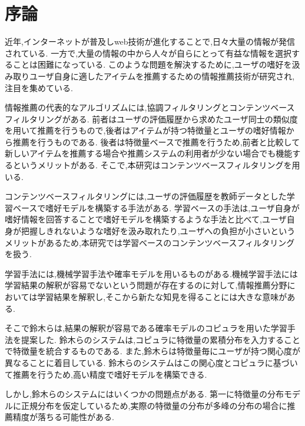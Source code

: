 \chapter{序論}
\hspace{1em}近年,インターネットが普及しweb技術が進化することで,日々大量の情報が発信されている.
一方で,大量の情報の中から人々が自らにとって有益な情報を選択することは困難になっている.
このような問題を解決するために,ユーザの嗜好を汲み取りユーザ自身に適したアイテムを推薦するための情報推薦技術が研究され,注目を集めている.\par
情報推薦の代表的なアルゴリズムには,協調フィルタリング\cite{user-based-collaborative-filtering}\cite{item-based-collaborative-filtering}とコンテンツベースフィルタリング\cite{content-based-filtering}がある.
前者はユーザの評価履歴から求めたユーザ同士の類似度を用いて推薦を行うもので,後者はアイテムが持つ特徴量とユーザの嗜好情報から推薦を行うものである.
後者は特徴量ベースで推薦を行うため,前者と比較して新しいアイテムを推薦する場合や推薦システムの利用者が少ない場合でも機能するというメリットがある.
そこで,本研究はコンテンツベースフィルタリングを用いる.\par
コンテンツベースフィルタリングには,ユーザの評価履歴を教師データとした学習ベースで嗜好モデルを構築する手法がある.
学習ベースの手法は,ユーザ自身が嗜好情報を回答することで嗜好モデルを構築するような手法と比べて,ユーザ自身が把握しきれないような嗜好を汲み取れたり,ユーザへの負担が小さいというメリットがあるため,本研究では学習ベースのコンテンツベースフィルタリングを扱う.\par
学習手法には,機械学習手法\cite{svm}\cite{neural-network}や確率モデル\cite{Suzuki}を用いるものがある.機械学習手法には学習結果の解釈が容易でないという問題が存在するのに対して,情報推薦分野においては学習結果を解釈し,そこから新たな知見を得ることには大きな意味がある.\par
そこで鈴木ら\cite{Suzuki}は,結果の解釈が容易である確率モデルのコピュラを用いた学習手法を提案した.
鈴木らのシステムは,コピュラに特徴量の累積分布を入力することで特徴量を統合するものである.
また,鈴木らは特徴量毎にユーザが持つ関心度が異なることに着目している.
鈴木らのシステムはこの関心度とコピュラに基づいて推薦を行うため,高い精度で嗜好モデルを構築できる.\par
しかし,鈴木らのシステムにはいくつかの問題点がある.
第一に特徴量の分布モデルに正規分布を仮定しているため,実際の特徴量の分布が多峰の分布の場合に推薦精度が落ちる可能性がある.
